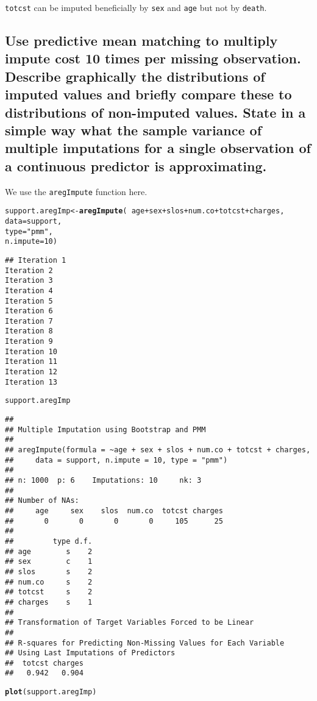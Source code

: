 \documentclass[headinclude=false]{scrartcl}\usepackage[]{graphicx}\usepackage[]{color}
\makeatletter
\newcommand{\hlnum}[1]{\textcolor[rgb]{0.686,0.059,0.569}{#1}}%
\newcommand{\hlstr}[1]{\textcolor[rgb]{0.192,0.494,0.8}{#1}}%
\newcommand{\hlopt}[1]{\textcolor[rgb]{0,0,0}{#1}}%
\newcommand{\hlstd}[1]{\textcolor[rgb]{0.345,0.345,0.345}{#1}}%
\newcommand{\hlkwb}[1]{\textcolor[rgb]{0.69,0.353,0.396}{#1}}%
\newcommand{\hlkwc}[1]{\textcolor[rgb]{0.333,0.667,0.333}{#1}}%
\newcommand{\hlkwd}[1]{\textcolor[rgb]{0.737,0.353,0.396}{\textbf{#1}}}%
\newenvironment{kframe}{%
 \def\at@end@of@kframe{}%
 \ifinner\ifhmode%
  \def\at@end@of@kframe{\end{minipage}}%
  \begin{minipage}{\columnwidth}%
 \fi\fi%
 \def\FrameCommand##1{\hskip\@totalleftmargin \hskip-\fboxsep
 \colorbox{shadecolor}{##1}\hskip-\fboxsep
     \hskip-\linewidth \hskip-\@totalleftmargin \hskip\columnwidth}%
 \MakeFramed {\advance\hsize-\width
   \@totalleftmargin\z@ \linewidth\hsize
   \@setminipage}}%
 {\par\unskip\endMakeFramed%
 \at@end@of@kframe}
\newenvironment{knitrout}{}{} %
\makeatother
\begin{document}
\texttt{totcst} can be imputed beneficially by \texttt{sex} and \texttt{age} but
not by \texttt{death}.

\subsection{Use predictive mean matching to multiply impute cost 10 times per missing
observation. Describe graphically the distributions of imputed values and
briefly compare these to distributions of non-imputed values. State in a simple 
way what the sample variance of multiple imputations for a single
observation of a continuous predictor is approximating.}

We use the \texttt{aregImpute} function here.

\begin{knitrout}
\color{fgcolor}\begin{kframe}
\begin{alltt}
\hlstd{support.aregImp} \hlkwb{<-} \hlkwd{aregImpute}\hlstd{(}\hlopt{~} \hlstd{age} \hlopt{+} \hlstd{sex} \hlopt{+} \hlstd{slos} \hlopt{+} \hlstd{num.co} \hlopt{+} \hlstd{totcst} \hlopt{+} \hlstd{charges,}
                              \hlkwc{data} \hlstd{= support,}
                              \hlkwc{type} \hlstd{=} \hlstr{"pmm"}\hlstd{,}
                              \hlkwc{n.impute} \hlstd{=} \hlnum{10}\hlstd{)}
\end{alltt}
\begin{verbatim}
## Iteration 1 
Iteration 2 
Iteration 3 
Iteration 4 
Iteration 5 
Iteration 6 
Iteration 7 
Iteration 8 
Iteration 9 
Iteration 10 
Iteration 11 
Iteration 12 
Iteration 13 

\end{verbatim}
\begin{alltt}
\hlstd{support.aregImp}
\end{alltt}
\begin{verbatim}
## 
## Multiple Imputation using Bootstrap and PMM
## 
## aregImpute(formula = ~age + sex + slos + num.co + totcst + charges, 
##     data = support, n.impute = 10, type = "pmm")
## 
## n: 1000 	p: 6 	Imputations: 10  	nk: 3 
## 
## Number of NAs:
##     age     sex    slos  num.co  totcst charges 
##       0       0       0       0     105      25 
## 
##         type d.f.
## age        s    2
## sex        c    1
## slos       s    2
## num.co     s    2
## totcst     s    2
## charges    s    1
## 
## Transformation of Target Variables Forced to be Linear
## 
## R-squares for Predicting Non-Missing Values for Each Variable
## Using Last Imputations of Predictors
##  totcst charges 
##   0.942   0.904
\end{verbatim}
\begin{alltt}
\hlkwd{plot}\hlstd{(support.aregImp)}
\end{alltt}
\end{kframe}


\end{knitrout}
\end{document}
